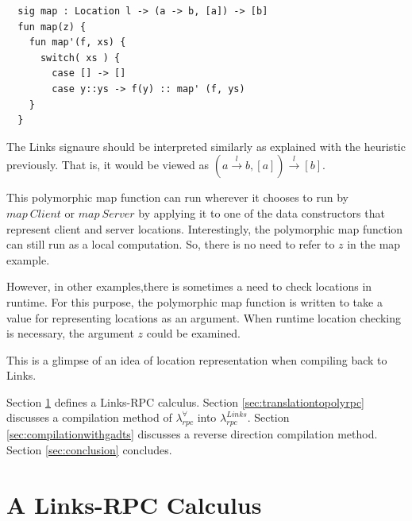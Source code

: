 \documentclass[a4paper]{article}
\theoremstyle{plain}
\theoremstyle{definition}
\newcommand{\polyrpc}{$\lambda_{rpc}^{\forall}$\xspace}
\newcommand{\linksrpc}{$\lambda_{rpc}^{Links}$\xspace}
\newcommand{\funL}[1]{\xrightarrow{#1}}
\begin{document}
\begin{lstlisting}
  sig map : Location l -> (a -> b, [a]) -> [b]
  fun map(z) {
    fun map'(f, xs) {
      switch( xs ) {
        case [] -> []
        case y::ys -> f(y) :: map' (f, ys)
    }
  }
\end{lstlisting}

%
The Links signaure should be interpreted similarly as explained with
the heuristic previously.
%
That is, it would be viewed as $(a \funL{l} b, [a]) \funL{l} [b]$.
%

This polymorphic map function can run wherever it chooses to run by
$map \ Client$ or $map \ Server$ by applying it to one of the data
constructors that represent client and server locations.
%
Interestingly, the polymorphic map function can still run as a local
computation.
%
So, there is no need to refer to $z$ in the map example.

However, in other examples,there is sometimes a need to check
locations in runtime.
%
For this purpose, the polymorphic map function is written to take a
value for representing locations as an argument.
%
When runtime location checking is necessary, the argument $z$ could be
examined.
%

%
This is a glimpse of an idea of location representation when
compiling back to Links.



%
Section \ref{sec:linksrpc} defines a Links-RPC calculus.
%
Section \ref{sec:translationtopolyrpc} discusses a compilation method
of \polyrpc into \linksrpc.
%
Section \ref{sec:compilationwithgadts} discusses a reverse direction
compilation method.
%
Section \ref{sec:conclusion} concludes.

\section{A Links-RPC Calculus}
\label{sec:linksrpc}
\end{document}
